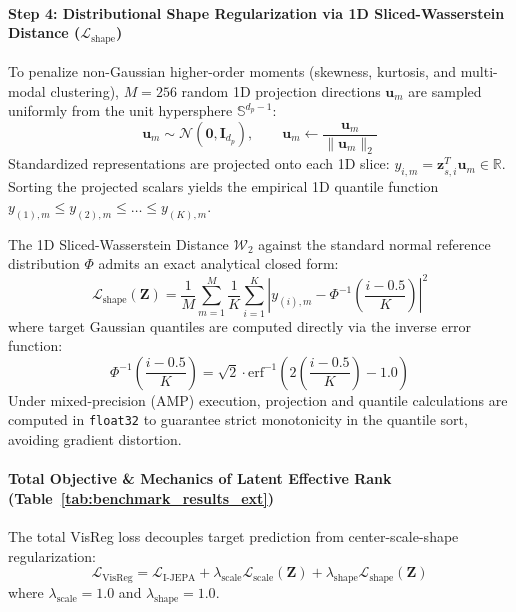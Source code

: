 \documentclass{article}
\begin{document}
\paragraph{Step 4: Distributional Shape Regularization via 1D Sliced-Wasserstein Distance ($\mathcal{L}_{\text{shape}}$)}
To penalize non-Gaussian higher-order moments (skewness, kurtosis, and multi-modal clustering), $M = 256$ random 1D projection directions $\mathbf{u}_m$ are sampled uniformly from the unit hypersphere $\mathbb{S}^{d_p - 1}$:
\begin{equation}
    \mathbf{u}_m \sim \mathcal{N}(\mathbf{0}, \mathbf{I}_{d_p}), \qquad \mathbf{u}_m \leftarrow \frac{\mathbf{u}_m}{\|\mathbf{u}_m\|_2}
\end{equation}
Standardized representations are projected onto each 1D slice: $y_{i, m} = \mathbf{z}_{s, i}^T \mathbf{u}_m \in \mathbb{R}$. Sorting the projected scalars yields the empirical 1D quantile function $y_{(1), m} \le y_{(2), m} \le \dots \le y_{(K), m}$.

The 1D Sliced-Wasserstein Distance $\mathcal{W}_2$ against the standard normal reference distribution $\Phi$ admits an exact analytical closed form:
\begin{equation}
    \mathcal{L}_{\text{shape}}(\mathbf{Z}) = \frac{1}{M} \sum_{m=1}^M \frac{1}{K} \sum_{i=1}^K \left| y_{(i), m} - \Phi^{-1}\left(\frac{i - 0.5}{K}\right) \right|^2
\end{equation}
where target Gaussian quantiles are computed directly via the inverse error function:
\begin{equation}
    \Phi^{-1}\left(\frac{i - 0.5}{K}\right) = \sqrt{2} \cdot \text{erf}^{-1}\left(2 \left(\frac{i - 0.5}{K}\right) - 1.0\right)
\end{equation}
Under mixed-precision (AMP) execution, projection and quantile calculations are computed in \texttt{float32} to guarantee strict monotonicity in the quantile sort, avoiding gradient distortion.

\paragraph{Total Objective \& Mechanics of Latent Effective Rank (Table~\ref{tab:benchmark_results_ext})}
The total VisReg loss decouples target prediction from center-scale-shape regularization:
\begin{equation}
    \mathcal{L}_{\text{VisReg}} = \mathcal{L}_{\text{I-JEPA}} + \lambda_{\text{scale}} \mathcal{L}_{\text{scale}}(\mathbf{Z}) + \lambda_{\text{shape}} \mathcal{L}_{\text{shape}}(\mathbf{Z})
\end{equation}
where $\lambda_{\text{scale}} = 1.0$ and $\lambda_{\text{shape}} = 1.0$.
\end{document}
